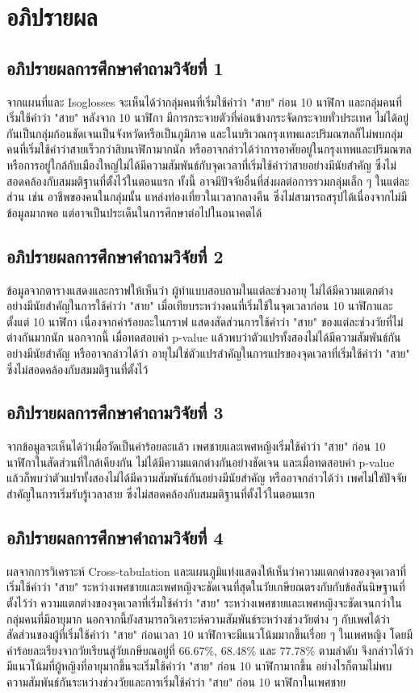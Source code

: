 \documentclass[a4paper]{article}
\begin{document}
\section{อภิปรายผล}
\subsection{อภิปรายผลการศึกษาคำถามวิจัยที่ 1}
    จากแผนที่และ Isoglosses จะเห็นได้ว่ากลุ่มคนที่เริ่มใช้คำว่า "สาย" ก่อน 10 นาฬิกา และกลุ่มคนที่เริ่มใช้คำว่า "สาย" หลังจาก 10 นาฬิกา มีการกระจายตัวที่ค่อนข้างกระจัดกระจายทั่วประเทศ ไม่ได้อยู่กันเป็นกลุ่มก้อนชัดเจนเป็นจังหวัดหรือเป็นภูมิภาค และในบริเวณกรุงเทพและปริมณฑลก็ไม่พบกลุ่มคนที่เริ่มใช้คำว่าสายเร็วกว่าสิบนาฬิกามากนัก หรืออาจกล่าวได้ว่าการอาศัยอยู่ในกรุงเทพและปริมณฑลหรือการอยู่ใกล้กับเมืองใหญ่ไม่ได้มีความสัมพันธ์กับจุดเวลาที่เริ่มใช้คำว่าสายอย่างมีนัยสำคัญ ซึ่งไม่สอดคล้องกับสมมติฐานที่ตั้งไว้ในตอนแรก ทั้งนี้ อาจมีปัจจัยอื่นที่ส่งผลต่อการรวมกลุ่มเล็ก ๆ ในแต่ละส่วน เช่น อาชีพของคนในกลุ่มนั้น แหล่งท่องเที่ยวในเวลากลางคืน ซึ่งไม่สามารถสรุปได้เนื่องจากไม่มีข้อมูลมากพอ แต่อาจเป็นประเด็นในการศึกษาต่อไปในอนาคตได้
\subsection{อภิปรายผลการศึกษาคำถามวิจัยที่ 2}
    ข้อมูลจากตารางแสดงและกราฟให้เห็นว่า ผู้ทำแบบสอบถามในแต่ละช่วงอายุ ไม่ได้มีความแตกต่างอย่างมีนัยสำคัญในการใช้คำว่า "สาย" เมื่อเทียบระหว่างคนที่เริ่มใช้ในจุดเวลาก่อน 10 นาฬิกาและตั้งแต่ 10 นาฬิกา เนื่องจากค่าร้อยละในกราฟ แสดงสัดส่วนการใช้คำว่า "สาย"  ของแต่ละช่วงวัยที่ไม่ต่างกันมากนัก นอกจากนี้ เมื่อทดสอบค่า p-value แล้วพบว่าตัวแปรทั้งสองไม่ได้มีความสัมพันธ์กันอย่างมีนัยสำคัญ หรืออาจกล่าวได้ว่า อายุไม่ใช่ตัวแปรสำคัญในการแปรของจุดเวลาที่เริ่มใช้คำว่า "สาย" ซึ่งไม่สอดคล้องกับสมมติฐานที่ตั้งไว้
\subsection{อภิปรายผลการศึกษาคำถามวิจัยที่ 3}
    จากข้อมูลจะเห็นได้ว่าเมื่อวัดเป็นค่าร้อยละแล้ว เพศชายและเพศหญิงเริ่มใช้คำว่า "สาย" ก่อน 10 นาฬิกาในสัดส่วนที่ใกล้เคียงกัน ไม่ได้มีความแตกต่างกันอย่างชัดเจน และเมื่อทดสอบค่า p-value แล้วก็พบว่าตัวแปรทั้งสองไม่ได้มีความสัมพันธ์กันอย่างมีนัยสำคัญ หรืออาจกล่าวได้ว่า เพศไม่ใช่ปัจจัยสำคัญในการเริ่มรับรู้เวลาสาย ซึ่งไม่สอดคล้องกับสมมติฐานที่ตั้งไว้ในตอนแรก
\subsection{อภิปรายผลการศึกษาคำถามวิจัยที่ 4}
    ผลจากการวิเคราะห์ Cross-tabulation และแผนภูมิแท่งแสดงให้เห็นว่าความแตกต่างของจุดเวลาที่เริ่มใช้คำว่า "สาย" ระหว่างเพศชายและเพศหญิงจะชัดเจนที่สุดในวัยเกษียณตรงกับกับข้อสันนิษฐานที่ตั้งไว้ว่า ความแตกต่างของจุดเวลาที่เริ่มใช้คำว่า "สาย" ระหว่างเพศชายและเพศหญิงจะชัดเจนกว่าในกลุ่มคนที่มีอายุมาก นอกจากนี้ยังสามารถวิเคราะห์ความสัมพันธ์ระหว่างช่วงวัยต่าง ๆ กับเพศได้ว่าสัดส่วนของผู้ที่เริ่มใช้คำว่า "สาย" ก่อนเวลา 10 นาฬิกาจะมีแนวโน้มมากขึ้นเรื่อย ๆ ในเพศหญิง โดยมีค่าร้อยละเรียงจากวัยเรียนสู่วัยเกษียณอยู่ที่ 66.67\%, 68.48\% และ 77.78\% ตามลำดับ จึงกล่าวได้ว่ามีแนวโน้มที่ผู้หญิงที่อายุมากขึ้นจะเริ่มใช้คำว่า "สาย" ก่อน 10 นาฬิกามากขึ้น อย่างไรก็ตามไม่พบความสัมพันธ์กันระหว่างช่วงวัยและการเริ่มใช้คำว่า "สาย" ก่อน 10 นาฬิกาในเพศชาย
\end{document}
